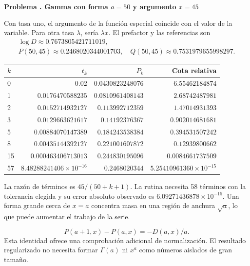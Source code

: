 \documentclass[11pt,a4paper]{article}
\theoremstyle{definition}
\newcounter{problema}
\newenvironment{resuelto}[1]{\refstepcounter{problema}\par\medskip\Needspace{6\baselineskip}\textbf{Problema \theproblema. #1}\par}{\par\medskip}
\begin{document}
\begin{resuelto}{Gamma con forma $a=50$ y argumento $x=45$}
Con tasa uno, el argumento de la función especial coincide con el valor de la variable. Para otra tasa $\lambda$, sería $\lambda x$. El prefactor y las referencias son
\[
\begin{gathered}
\log D\approx0.7673805421711019,\\
P(50,45)\approx0.2468020344001703,\quad Q(50,45)\approx0.7531979655998297.
\end{gathered}
\]

\begin{center}\small\begin{tabular}{lrrr}
\toprule
$k$ & $t_k$ & $P_k$ & Cota relativa\\\midrule
0 & $0.02$ & $0.0430823248076$ & $6.55462184874$\\
1 & $0.0176470588235$ & $0.0810961408143$ & $2.68742487981$\\
2 & $0.0152714932127$ & $0.113992712359$ & $1.47014931393$\\
3 & $0.0129663621617$ & $0.14192376367$ & $0.902014681681$\\
5 & $0.00884070147389$ & $0.184243538384$ & $0.394531507242$\\
8 & $0.00435144392127$ & $0.221001607872$ & $0.12939800662$\\
15 & $0.000463406713013$ & $0.244830195096$ & $0.0084661737509$\\
57 & $8.48288241406\times10^{-16}$ & $0.2468020344$ & $5.25410961360\times10^{-15}$\\
\bottomrule\end{tabular}\end{center}

La razón de términos es $45/(50+k+1)$. La rutina necesita 58 términos con la tolerancia elegida y su error absoluto observado es $6.09271436878\times10^{-15}$. Una forma grande cerca de $x=a$ concentra masa en una región de anchura $\sqrt a$, lo que puede aumentar el trabajo de la serie.

\[
P(a+1,x)-P(a,x)=-D(a,x)/a.
\]
Esta identidad ofrece una comprobación adicional de normalización. El resultado regularizado no necesita formar $\Gamma(a)$ ni $x^a$ como números aislados de gran tamaño.
\end{resuelto}
\end{document}
